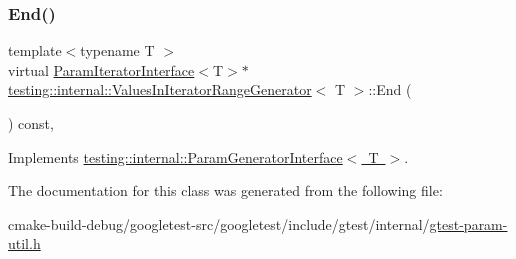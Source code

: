 \mbox{\label{classtesting_1_1internal_1_1ValuesInIteratorRangeGenerator_a4af95b9eccfc86c40a715df2d9d0df40}} 
\subsubsection{\texorpdfstring{End()}{End()}}
{\footnotesize\ttfamily template$<$typename T $>$ \\
virtual \mbox{\hyperlink{classtesting_1_1internal_1_1ParamIteratorInterface}{Param\+Iterator\+Interface}}$<$T$>$$\ast$ \mbox{\hyperlink{classtesting_1_1internal_1_1ValuesInIteratorRangeGenerator}{testing\+::internal\+::\+Values\+In\+Iterator\+Range\+Generator}}$<$ T $>$\+::End (\begin{DoxyParamCaption}{ }\end{DoxyParamCaption}) const\hspace{0.3cm}{\ttfamily [inline]}, {\ttfamily [virtual]}}



Implements \mbox{\hyperlink{classtesting_1_1internal_1_1ParamGeneratorInterface_afa7211b74990e11d3fc7ad4e7113da4f}{testing\+::internal\+::\+Param\+Generator\+Interface$<$ T $>$}}.



The documentation for this class was generated from the following file\+:\begin{DoxyCompactItemize}
\item 
cmake-\/build-\/debug/googletest-\/src/googletest/include/gtest/internal/\mbox{\hyperlink{gtest-param-util_8h}{gtest-\/param-\/util.\+h}}\end{DoxyCompactItemize}
